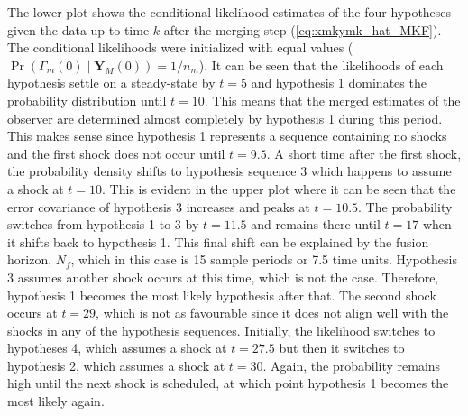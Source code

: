The lower plot shows the conditional likelihood estimates of the four hypotheses given the data up to time $k$ after the merging step (\ref{eq:xmkymk_hat_MKF}). The conditional likelihoods were initialized with equal values ($\operatorname{Pr}\left(\Gamma_m(0) \mid \mathbf{Y}_M(0)\right)=1/n_m$). It can be seen that the likelihoods of each hypothesis settle on a steady-state by $t=5$ and hypothesis 1 dominates the probability distribution until $t=10$. This means that the merged estimates of the observer are determined almost completely by hypothesis 1 during this period. This makes sense since hypothesis 1 represents a sequence containing no shocks and the first shock does not occur until $t=9.5$. A short time after the first shock, the probability density shifts to hypothesis sequence 3 which happens to assume a shock at $t=10$. This is evident in the upper plot where it can be seen that the error covariance of hypothesis 3 increases and peaks at $t=10.5$. The probability switches from hypothesis 1 to 3 by $t=11.5$ and remains there until $t=17$ when it shifts back to hypothesis 1. This final shift can be explained by the fusion horizon, $N_f$, which in this case is 15 sample periods or 7.5 time units. Hypothesis 3 assumes another shock occurs at this time, which is not the case. Therefore, hypothesis 1 becomes the most likely hypothesis after that. The second shock occurs at $t=29$, which is not as favourable since it does not align well with the shocks in any of the hypothesis sequences. Initially, the likelihood switches to hypotheses 4, which assumes a shock at $t=27.5$ but then it switches to hypothesis 2, which assumes a shock at $t=30$. Again, the probability remains high until the next shock is scheduled, at which point hypothesis 1 becomes the most likely again.

